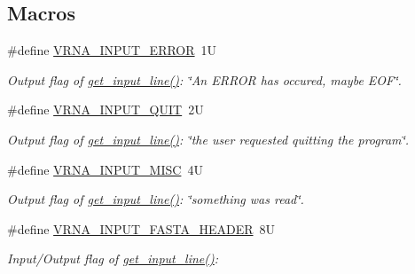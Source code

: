 \subsection*{Macros}
\begin{DoxyCompactItemize}
\item 
\mbox{\label{group__utils_gad403c9ea58f1836689404c2931419c8c}} 
\#define \hyperlink{group__utils_gad403c9ea58f1836689404c2931419c8c}{V\+R\+N\+A\+\_\+\+I\+N\+P\+U\+T\+\_\+\+E\+R\+R\+OR}~1U
\begin{DoxyCompactList}\small\item\em Output flag of \hyperlink{group__utils_ga8ef1835eb83f542396f59f0b205965e5}{get\+\_\+input\+\_\+line()}\+: {\itshape \char`\"{}\+An E\+R\+R\+O\+R has occured, maybe E\+O\+F\char`\"{}}. \end{DoxyCompactList}\item 
\mbox{\label{group__utils_ga72f3c6ca5c83d2b9baed2922d19c403d}} 
\#define \hyperlink{group__utils_ga72f3c6ca5c83d2b9baed2922d19c403d}{V\+R\+N\+A\+\_\+\+I\+N\+P\+U\+T\+\_\+\+Q\+U\+IT}~2U
\begin{DoxyCompactList}\small\item\em Output flag of \hyperlink{group__utils_ga8ef1835eb83f542396f59f0b205965e5}{get\+\_\+input\+\_\+line()}\+: {\itshape \char`\"{}the user requested quitting the program\char`\"{}}. \end{DoxyCompactList}\item 
\mbox{\label{group__utils_ga8e3241b321c9c1a78a69e59e2e019a71}} 
\#define \hyperlink{group__utils_ga8e3241b321c9c1a78a69e59e2e019a71}{V\+R\+N\+A\+\_\+\+I\+N\+P\+U\+T\+\_\+\+M\+I\+SC}~4U
\begin{DoxyCompactList}\small\item\em Output flag of \hyperlink{group__utils_ga8ef1835eb83f542396f59f0b205965e5}{get\+\_\+input\+\_\+line()}\+: {\itshape \char`\"{}something was read\char`\"{}}. \end{DoxyCompactList}\item 
\#define \hyperlink{group__utils_ga2f0d8069e93d3ac54d9320d6bdb8e7e7}{V\+R\+N\+A\+\_\+\+I\+N\+P\+U\+T\+\_\+\+F\+A\+S\+T\+A\+\_\+\+H\+E\+A\+D\+ER}~8U
\begin{DoxyCompactList}\small\item\em Input/\+Output flag of \hyperlink{group__utils_ga8ef1835eb83f542396f59f0b205965e5}{get\+\_\+input\+\_\+line()}\+:~\newline

\end{DoxyCompactList}
\end{DoxyCompactItemize}
